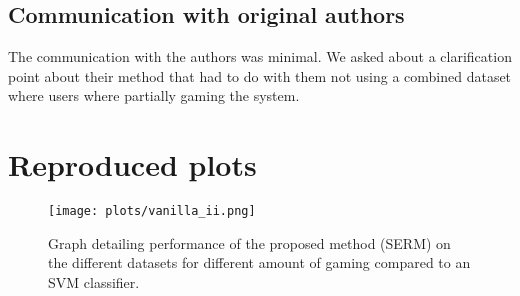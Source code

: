 

\subsection{Communication with original authors}
The communication with the authors was minimal. We asked about a clarification point about their method that had to do with them not using a combined dataset where users where partially gaming the system.






\appendix
\section{Reproduced plots}\label{app:plots}
\begin{figure}[H]
    \centering
    \texttt{[image: plots/vanilla\_ii.png]}
    \caption{Graph detailing performance of the proposed method (SERM) on the different datasets for different amount of gaming compared to an SVM classifier.}
    \label{fig:vanilla_II}
\end{figure}
